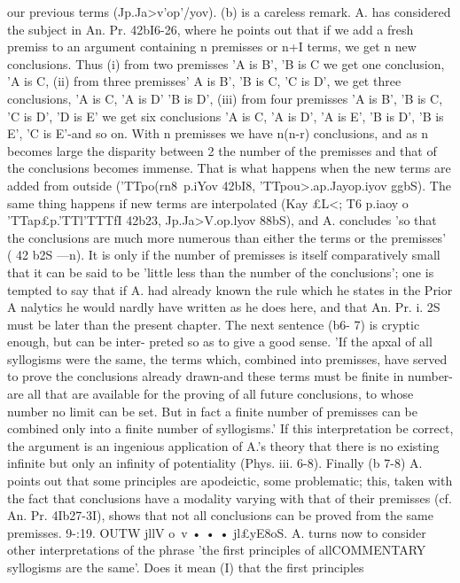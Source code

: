 our previous terms (Jp.{Ja>v'op'/yov).
(b) is a careless remark. A. has considered the subject in An.
Pr. 42bI6-26, where he points out that if we add a fresh premiss
to an argument containing n premisses or n+I terms, we get
n new conclusions. Thus (i) from two premisses 'A is B', 'B is
C we get one conclusion, 'A is C, (ii) from three premisses' A is
B', 'B is C, 'C is D', we get three conclusions, 'A is C, 'A is D'
'B is D', (iii) from four premisses 'A is B', 'B is C, 'C is D',
'D is E' we get six conclusions 'A is C, 'A is D', 'A is E', 'B is
D', 'B is E', 'C is E'-and so on. With n premisses we have
n(n-r) conclusions, and as n becomes large the disparity between
2
the number of the premisses and that of the conclusions becomes
immense. That is what happens when the new terms are added
from outside ('TTpo(rn8~p.iYov 42bI8, 'TTpou>.ap.{Jayop.iyov ggbS). The
same thing happens if new terms are interpolated (Kay £L<; T6
p.iaoy o~ 'TTap£p.'TTl'TTTfI 42b23, Jp.{Ja>V.op.lyov 88bS), and A. concludes
'so that the conclusions are much more numerous than either
the terms or the premisses' ( 42 b2S ---n). It is only if the number of
premisses is itself comparatively small that it can be said to be
'little less than the number of the conclusions'; one is tempted
to say that if A. had already known the rule which he states in
the Prior A nalytics he would nardly have written as he does here,
and that An. Pr. i. 2S must be later than the present chapter.
The next sentence (b6- 7) is cryptic enough, but can be inter-
preted so as to give a good sense. 'If the apxal of all syllogisms
were the same, the terms which, combined into premisses, have
served to prove the conclusions already drawn-and these terms
must be finite in number-are all that are available for the
proving of all future conclusions, to whose number no limit can
be set. But in fact a finite number of premisses can be combined
only into a finite number of syllogisms.'
If this interpretation be correct, the argument is an ingenious
application of A.'s theory that there is no existing infinite but
only an infinity of potentiality (Phys. iii. 6-8).
Finally (b 7-8) A. points out that some principles are apodeictic,
some problematic; this, taken with the fact that conclusions
have a modality varying with that of their premisses (cf. An. Pr.
4Ib27-3I), shows that not all conclusions can be proved from the
same premisses.
9-:19. OUTW jllV o~v • • • jl£yE8oS. A. turns now to consider
other interpretations of the phrase 'the first principles of allCOMMENTARY
syllogisms are the same'. Does it mean (I) that the first principles
}}}
